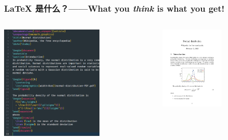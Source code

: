 \begin{frame}[fragile]
\frametitle{\LaTeX{} 是什么？\mbox{}——\mbox{}What you \emph{think} is what you get!}
\begin{columns}
\begin{column}{0.48\textwidth}
  \centering
  \includegraphics[width=0.75\textwidth]{images/code.png}
\end{column}
\begin{column}{0.48\textwidth}
  \begin{figure}
    \centering
    \includegraphics[width=0.75\textwidth]{images/normal-dist.png}
  \end{figure}
\end{column}
\end{columns}
\end{frame}


